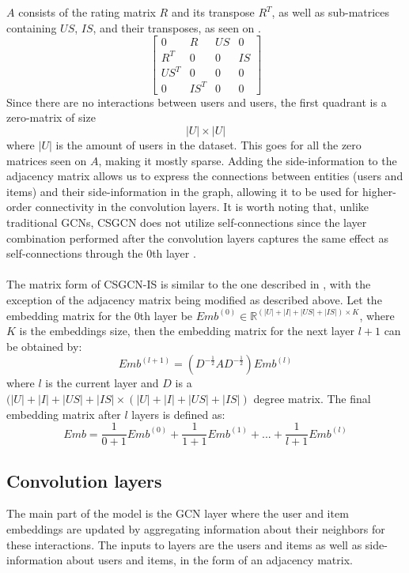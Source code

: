 $A$ consists of the rating matrix $R$ and its transpose $R^T$, as well as sub-matrices containing $US$, $IS$, and their transposes, as seen on .
\begin{equation}\label{csgcn_is_adj_mat}
    \begin{bmatrix}
    0 & R & US & 0\\
    R^T & 0 & 0 & IS\\
    US^T & 0 & 0 & 0 \\
    0 & IS^T & 0 & 0
    \end{bmatrix}
\end{equation}
Since there are no interactions between users and users, the first quadrant is a zero-matrix of size $$|U|\times|U|$$ where $|U|$ is the amount of users in the dataset.
This goes for all the zero matrices seen on $A$, making it mostly sparse.
Adding the side-information to the adjacency matrix allows us to express the connections between entities (users and items) and their side-information in the graph, allowing it to be used for higher-order connectivity in the convolution layers.
It is worth noting that, unlike traditional GCNs, CSGCN does not utilize self-connections since the layer combination performed after the convolution layers captures the same effect as self-connections through the 0th layer \cite{LightGCN}.
\\\\
The matrix form of CSGCN-IS is similar to the one described in \cite{LightGCN}, with the exception of the adjacency matrix being modified as described above.
Let the embedding matrix for the 0th layer be $Emb^{(0)} \in \mathbb{R}^{(|U| + |I| + |US| + |IS|) \times K}$, where $K$ is the embeddings size, then the embedding matrix for the next layer $l+1$ can be obtained by:
\begin{equation}
    Emb^{(l+1)} = (D^{-\frac{1}{2}}AD^{-\frac{1}{2}})Emb^{(l)}
\end{equation}
where $l$ is the current layer and $D$ is a $(|U| + |I| + |US| + |IS| \times (|U| + |I| + |US| + |IS|)$ degree matrix. 
The final embedding matrix after $l$ layers is defined as:
\begin{equation}
    Emb = \frac{1}{0 +1}Emb^{(0)} + \frac{1}{1 +1}Emb^{(1)} + ... + \frac{1}{l +1}Emb^{(l)}
\end{equation}


\subsection{Convolution layers}\label{subsec:csgcn_is_conv_layer}
The main part of the model is the GCN layer where the user and item embeddings are updated by aggregating information about their neighbors for these interactions.
The inputs to layers are the users and items as well as side-information about users and items, in the form of an adjacency matrix.

